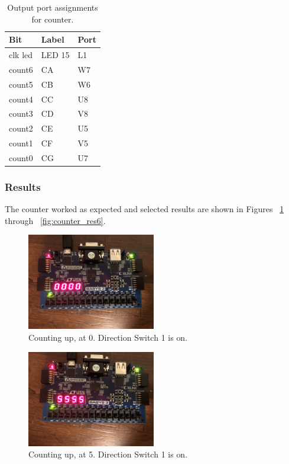 \documentclass[11pt]{article}
\begin{document}
\begin{table}[H]
\begin{center}
\begin{tabular}{| l | l | l |}
	\hline
	Bit & Label & Port \\ \hline
	clk led & LED 15 & L1 \\ \hline
	count6 & CA & W7 \\ \hline
	count5 & CB & W6 \\ \hline
	count4 & CC & U8 \\ \hline
	count3 & CD & V8 \\ \hline
	count2 & CE & U5 \\ \hline
	count1 & CF & V5 \\ \hline
	count0 & CG & U7 \\ \hline
\end{tabular}
\caption{\label{tab:counter_output_Ports}Output port assignments for counter.}
\end{center}
\end{table}

\subsubsection{Results}
The counter worked as expected and selected results are shown in Figures ~\ref{fig:counter_res1} through ~\ref{fig:counter_res6}.

\begin{figure}[H]
\begin{center}
	\includegraphics[width=0.5\textwidth]{./images/p1/IMG_1001.jpg}
	\caption{\label{fig:counter_res1}Counting up, at 0. Direction Switch 1 is on.}
\end{center}
\end{figure}

\begin{figure}[H]
\begin{center}
	\includegraphics[width=0.5\textwidth]{./images/p1/IMG_1002.jpg}
	\caption{\label{fig:counter_res2}Counting up, at 5. Direction Switch 1 is on.}
\end{center}
\end{figure}
\end{document}
